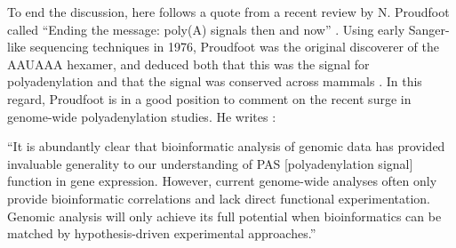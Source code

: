 To end the discussion, here follows a quote from a recent review by N.
Proudfoot called ``Ending the message: poly(A) signals then and now''
\cite{proudfoot_ending_2011}. Using early Sanger-like sequencing techniques in
1976, Proudfoot was the original discoverer of the AAUAAA hexamer, and deduced
both that this was the signal for polyadenylation and that the signal was
conserved across mammals \cite{proudfoot_3_1976}. In this regard, Proudfoot is
in a good position to comment on the recent surge in genome-wide
polyadenylation studies. He writes \cite{proudfoot_ending_2011}:

``It is abundantly clear that bioinformatic analysis of genomic data has
provided invaluable generality to our understanding of PAS [polyadenylation
signal] function in gene expression. However, current genome-wide analyses
often only provide bioinformatic correlations and lack direct functional
experimentation. Genomic analysis will only achieve its full potential when
bioinformatics can be matched by hypothesis-driven experimental approaches.''


